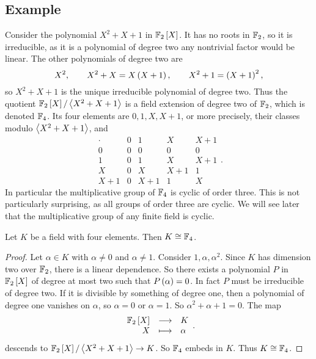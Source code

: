 \subsection{Example}

\begin{example*}
Consider the polynomial $ X^2 + X + 1 $ in $ \FF_2\sbr{X} $. It has no roots in $ \mathbb{F}_2 $, so it is irreducible, as it is a polynomial of degree two any nontrivial factor would be linear. The other polynomials of degree two are
$$ X^2, \qquad X^2 + X = X\br{X + 1}, \qquad X^2 + 1 = \br{X + 1}^2, $$
so $ X^2 + X + 1 $ is the unique irreducible polynomial of degree two. Thus the quotient $ \FF_2\sbr{X} / \abr{X^2 + X + 1} $ is a field extension of degree two of $ \mathbb{F}_2 $, which is denoted $ \mathbb{F}_4 $. Its four elements are $ 0, 1, X, X + 1 $, or more precisely, their classes modulo $ \left\langle X^2 + X + 1 \right\rangle $, and
$$
\begin{array}{c|cccc}
\cdot & 0 & 1 & X & X + 1 \\
\hline
0 & 0 & 0 & 0 & 0 \\
1 & 0 & 1 & X & X + 1 \\
X & 0 & X & X + 1 & 1 \\
X + 1 & 0 & X + 1 & 1 & X
\end{array}.
$$
In particular the multiplicative group of $ \mathbb{F}_4 $ is cyclic of order three. This is not particularly surprising, as all groups of order three are cyclic. We will see later that the multiplicative group of any finite field is cyclic.
\end{example*}

\begin{proposition}
Let $ K $ be a field with four elements. Then $ K \cong \mathbb{F}_4 $.
\end{proposition}

\begin{proof}
Let $ \alpha \in K $ with $ \alpha \ne 0 $ and $ \alpha \ne 1 $. Consider $ 1, \alpha, \alpha^2 $. Since $ K $ has dimension two over $ \mathbb{F}_2 $, there is a linear dependence. So there exists a polynomial $ P $ in $ \FF_2\sbr{X} $ of degree at most two such that $ P\br{\alpha} = 0 $. In fact $ P $ must be irreducible of degree two. If it is divisible by something of degree one, then a polynomial of degree one vanishes on $ \alpha $, so $ \alpha = 0 $ or $ \alpha = 1 $. So $ \alpha^2 + \alpha + 1 = 0 $. The map
$$ \function{\FF_2\sbr{X}}{K}{X}{\alpha}. $$
descends to $ \FF_2\sbr{X} / \abr{X^2 + X + 1} \to K $. So $ \mathbb{F}_4 $ embeds in $ K $. Thus $ K \cong \mathbb{F}_4 $.
\end{proof}

